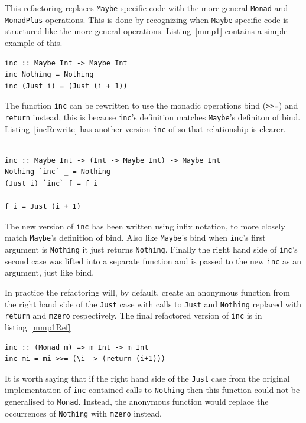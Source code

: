 This refactoring replaces \texttt{Maybe} specific code with the more general \texttt{Monad} and \texttt{MonadPlus} operations. This is done by recognizing when \texttt{Maybe} specific code is structured like the more general operations. Listing~\ref{mmp1} contains a simple example of this.  

\begin{lstlisting}[caption={\texttt{inc}},label=mmp1]
inc :: Maybe Int -> Maybe Int
inc Nothing = Nothing
inc (Just i) = (Just (i + 1))
\end{lstlisting}

The function \texttt{inc} can be rewritten to use the monadic operations bind (\texttt{>>=}) and \texttt{return} instead, this is because \texttt{inc}'s definition matches \texttt{Maybe}'s definiton of bind. Listing~\ref{incRewrite} has another version \texttt{inc} of so that relationship is clearer. 

\begin{lstlisting}[caption={\texttt{inc} rewritten to look more like bind},label=incRewrite]

inc :: Maybe Int -> (Int -> Maybe Int) -> Maybe Int
Nothing `inc` _ = Nothing
(Just i) `inc` f = f i

f i = Just (i + 1)
\end{lstlisting}

The new version of \texttt{inc} has been written using infix notation, to more closely match \texttt{Maybe}'s definition of bind. Also like \texttt{Maybe}'s bind when \texttt{inc}'s first argument is \texttt{Nothing} it just returns \texttt{Nothing}. Finally the right hand side of \texttt{inc}'s second case was lifted into a separate function and is passed to the new \texttt{inc} as an argument, just like bind.

In practice the refactoring will, by default, create an anonymous function from the right hand side of the \texttt{Just} case with calls to \texttt{Just} and \texttt{Nothing} replaced with \texttt{return} and \texttt{mzero} respectively. The final refactored version of \texttt{inc} is in listing~\ref{mmp1Ref} 

\begin{lstlisting}[caption={Final output from generalising \texttt{inc}},label=mmp1Ref]
inc :: (Monad m) => m Int -> m Int
inc mi = mi >>= (\i -> (return (i+1)))
\end{lstlisting}

It is worth saying that if the right hand side of the \texttt{Just} case from the original implementation of \texttt{inc} contained calls to \texttt{Nothing} then this function could not be generalised to \texttt{Monad}. Instead, the anonymous function would replace the occurrences of \texttt{Nothing} with \texttt{mzero} instead.  
 

